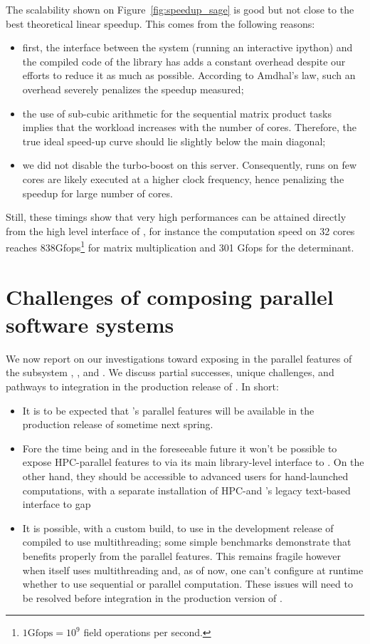 \documentclass{deliverablereport}
\begin{document}
The scalability shown on Figure~\ref{fig:speedup_sage} is good but not close to the best theoretical linear
speedup. This comes from the following reasons:
\begin{itemize}
\item first, the interface between the system \SageMath (running an interactive ipython) and the compiled code of the
  library has adds a constant overhead despite our efforts to reduce it as much as possible. According to Amdhal's law,
  such an overhead severely penalizes the speedup measured;
\item the use of sub-cubic arithmetic for the sequential matrix product tasks implies that the workload increases with
  the number of cores. Therefore, the true ideal speed-up curve should lie slightly below the main diagonal;
\item we did not disable the turbo-boost on this server. Consequently, runs on few cores are likely executed at a higher
  clock frequency, hence penalizing the speedup for large number of cores.
\end{itemize}

Still, these timings show that very high performances can be attained directly from the high level interface of
\SageMath, for instance the computation speed on 32 cores reaches 838Gfops\footnote{$1\text{Gfops} = 10^9$ field
  operations per second.} for matrix multiplication and 301 Gfops for
the determinant.

\section{Challenges of composing parallel software systems}

We now report on our investigations toward exposing in \SageMath the
parallel features of the subsystem \Singular, \GAP, and \Pari. We
discuss partial successes, unique challenges, and pathways to
integration in the production release of \SageMath. In short:
\begin{itemize}
\item It is to be expected that \Singular's parallel features will be
  available in the production release of \Sage sometime next spring.
\item Fore the time being and in the foreseeable future it won't be
  possible to expose HPC-\GAP parallel features to \Sage via its main
  library-level interface to \GAP. On the other hand, they should be
  accessible to advanced users for hand-launched computations, with a
  separate installation of HPC-\GAP and \Sage's legacy text-based
  interface to gap
\item It is possible, with a custom build, to use in \Sage the
  development release of \Pari compiled to use multithreading;
  some simple
  benchmarks demonstrate that \Sage benefits properly from the parallel
  features. This remains fragile however when \Sage itself uses
  multithreading and, as of now, one can't configure at runtime
  whether to use sequential or parallel computation. These issues will
  need to be resolved before integration in the production version of
  \SageMath.
\end{itemize}
\end{document}
